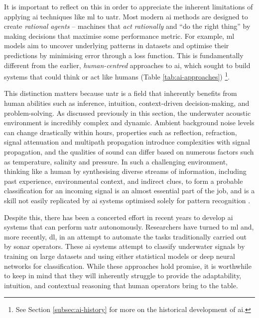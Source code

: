 It is important to reflect on this in order to appreciate the inherent limitations of applying \acrshort{ai} techniques like \acrlong{ml} to \acrshort{uatr}. Most modern \acrshort{ai} methods are designed to create \textit{rational agents} -- machines that \textit{act rationally} and ``do the right thing'' by making decisions that maximise some performance metric. For example, \acrlong{ml} models aim to uncover underlying patterns in datasets and optimise their predictions by minimising error through a loss function. This is fundamentally different from the earlier, \textit{human-centred} approaches to \acrshort{ai}, which sought to build systems that could think or act like humans (Table \ref{tab:ai-approaches}) \cite{carnegie_mellon_university_human_2001, russell_artificial_2021}\footnote{See Section \ref{subsec:ai-history} for more on the historical development of \acrshort{ai}.}.

This distinction matters because \acrshort{uatr} is a field that inherently benefits from human abilities such as inference, intuition, context-driven decision-making, and problem-solving. As discussed previously in this section, the underwater acoustic environment is incredibly complex and dynamic. Ambient background noise levels can change drastically within hours, properties such as reflection, refraction, signal attenuation and multipath propagation introduce complexities with signal propagation, and the qualities of sound can differ based on numerous factors such as temperature, salinity and pressure. In such a challenging environment, thinking like a human by synthesising diverse streams of information, including past experience, environmental context, and indirect clues, to form a probable classification for an incoming signal is an almost essential part of the job, and is a skill not easily replicated by \acrshort{ai} systems optimised solely for pattern recognition \cite{kamal_deep_2013}.

Despite this, there has been a concerted effort in recent years to develop \acrshort{ai} systems that can perform \acrshort{uatr} autonomously. Researchers have turned to \acrlong{ml} and, more recently, \acrlong{dl}, in an attempt to automate the tasks traditionally carried out by sonar operators. These \acrshort{ai} systems attempt to classify underwater signals by training on large datasets and using either statistical models or deep neural networks for classification. While these approaches hold promise, it is worthwhile to keep in mind that they will inherently struggle to provide the adaptability, intuition, and contextual reasoning that human operators bring to the table.

